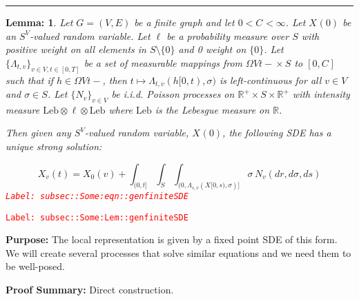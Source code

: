 \documentclass[12pt]{article}
\newcommand{\mb}{\mathbb}
\newcommand{\te}{\text}
\newcommand{\tr}{\textcolor{red}}
\newcommand{\labe}[1]{\tr{\texttt{Label: #1}}}
\newcommand{\purpose}{\textbf{Purpose: }}
\newcommand{\pfsum}{\textbf{Proof Summary: }}
\newcommand{\ind}{\hspace{24pt}}
\newcommand{\lin}{\rule{\linewidth}{0.4 pt}}
\renewcommand{\v}{v}							%
\renewcommand{\S}{S}							%
\newcommand{\s}{\sigma}							%
\newcommand{\T}{T}								%
\renewcommand{\t}{t}							%
\newcommand{\poiss}[1]{N_{#1}}						%
\newcommand{\leb}{\te{Leb}}							%
\renewcommand{\G}{G}								%
\newcommand{\V}{V}									%
\newcommand{\E}{E}									%
\renewcommand{\tt}{s}								%
\renewcommand{\r}{r}								%
\newcommand{\rxvt}[2]{X_{#1}{(#2)}}					%
\newcommand{\rxvts}[2]{X_{#1}{#2}}					%
\newcommand{\ratee}[1]{\Lambda_{#1}}				%
\newcommand{\const}[1]{C_{#1}}						%
\newcommand{\Sm}{\ell}								%
\newtheorem{lem}[thms]{Lemma: }
\begin{document}
\lin

\begin{lem}
Let \(\G = (\V,\E)\) be a finite graph and let \(0 < \const{}< \infty\). Let \(\rxvt{}{0}\) be an \(\S^\V\)-valued random variable. Let \(\Sm\) be a probability measure over \(\S\) with positive weight on all elements in \(S\setminus\{0\}\) and 0 weight on \(\{0\}\). Let \(\{\ratee{\t,\v}\}_{\v \in \V,\t\in [0,\T]}\) be a set of measurable mappings from \(\Omega{\V}{\t-} \times \S\) to \([0,\const{}]\) such that if \(h \in \Omega{\V}{\t-}\), then \(\t\mapsto \ratee{\t,\v}(h[0,\t),\s)\) is left-continuous for all \(\v \in \V\) and \(\s \in \S\). Let \(\{\poiss{\v}\}_{\v \in \V}\) be i.i.d. Poisson processes on \(\mb{R}^+\times \S\times\mb{R}^+\) with intensity measure \(\leb\otimes\Sm\otimes\leb\) where \(\leb\) is the Lebesgue measure on \(\mb{R}\).

\ind Then given any \(\S^\V\)-valued random variable, \(\rxvt{}{0}\), the following SDE has a unique strong solution:

\begin{equation}
\rxvt{\v}{\t} = \rxvt{0}{\v} + \int_{(0,\t]}\int_\S\int_{(0,\ratee{\tt,\v}(\rxvts{}{[0,\tt)},\s)]}  \s\,\poiss{\v}(d\r,d\s,d\tt)
\label{subsec::Some:eqn::genfiniteSDE}
\end{equation}
\labe{subsec::Some:eqn::genfiniteSDE}
\label{subsec::Some:Lem::genfiniteSDE}
\end{lem}
\labe{subsec::Some:Lem::genfiniteSDE}

\purpose The local representation is given by a fixed point SDE of this form. We will create several processes that solve similar equations and we need them to be well-posed.

\pfsum Direct construction.
\end{document}
